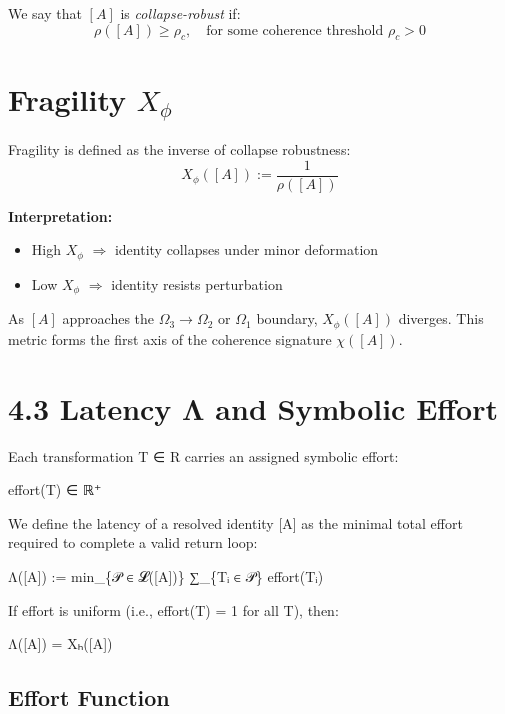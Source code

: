 We say that $[A]$ is \textit{collapse-robust} if:
\begin{equation} \label{eq:collapse-threshold}
\rho([A]) \geq \rho_c, \quad \text{for some coherence threshold } \rho_c > 0
\end{equation}

\section{Fragility $X_\phi$}

\begin{definition}[Fragility] \label{def:fragility}
Fragility is defined as the inverse of collapse robustness:
\begin{equation} \label{eq:fragility}
X_\phi([A]) := \frac{1}{\rho([A])}
\end{equation}
\end{definition}

\textbf{Interpretation:}
\begin{itemize}
  \item High $X_\phi$ $\Rightarrow$ identity collapses under minor deformation
  \item Low $X_\phi$ $\Rightarrow$ identity resists perturbation
\end{itemize}

As $[A]$ approaches the $\Omega_3 \rightarrow \Omega_2$ or $\Omega_1$ boundary, $X_\phi([A])$ diverges.  
This metric forms the first axis of the coherence signature $\chi([A])$.

\section{4.3 \textbar{} Latency Λ and Symbolic
Effort}\label{latency-ux3bb-and-symbolic-effort}

Each transformation T ∈ R carries an assigned symbolic effort:

effort(T) ∈ ℝ⁺

We define the latency of a resolved identity {[}A{]} as the minimal
total effort required to complete a valid return loop:

Λ({[}A{]}) := min\_\{𝒫 ∈ 𝓛({[}A{]})\} ∑\_\{Tᵢ ∈ 𝒫\} effort(Tᵢ)

If effort is uniform (i.e., effort(T) = 1 for all T), then:

Λ({[}A{]}) = Xₕ({[}A{]})

\subsection{Effort Function}\label{effort-function}

